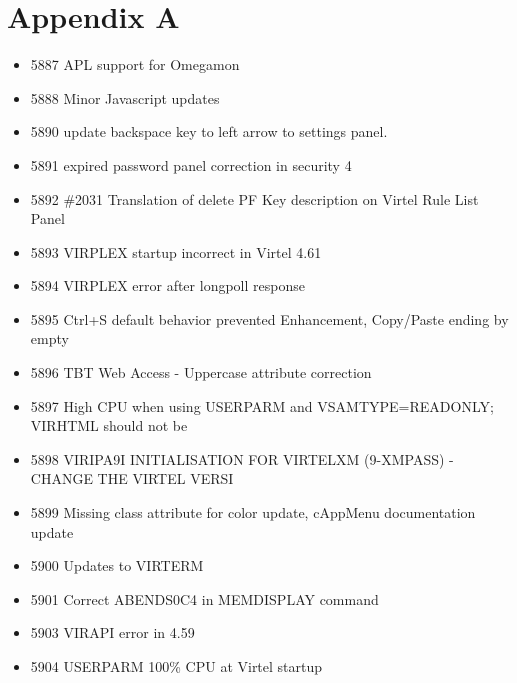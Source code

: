 \documentclass[letterpaper,10pt,english]{sphinxmanual}
\begin{document}
\chapter{Appendix A}
\label{\detokenize{TN202303:appendix-a}}
\begin{itemize}
\item {} 
5887 APL support for Omegamon

\item {} 
5888 Minor Javascript updates

\item {} 
5890 update backspace key to left arrow to settings panel.

\item {} 
5891 expired password panel correction in security 4

\item {} 
5892 \#2031 Translation of delete PF Key description on Virtel Rule List Panel

\item {} 
5893 VIRPLEX startup incorrect in Virtel 4.61

\item {} 
5894 VIRPLEX error after longpoll response

\item {} 
5895 Ctrl+S default behavior prevented Enhancement, Copy/Paste ending by empty

\item {} 
5896 TBT Web Access - Uppercase attribute correction

\item {} 
5897 High CPU when using USERPARM and VSAMTYPE=READONLY; VIRHTML should not be

\item {} 
5898 VIRIPA9I INITIALISATION FOR VIRTELXM (9-XMPASS) - CHANGE THE VIRTEL VERSI

\item {} 
5899 Missing class attribute for color update, cAppMenu documentation update

\item {} 
5900 Updates to VIRTERM

\item {} 
5901 Correct ABENDS0C4 in MEMDISPLAY command

\item {} 
5903 VIRAPI error in 4.59

\item {} 
5904 USERPARM 100\% CPU at Virtel startup


\end{itemize}
\end{document}
